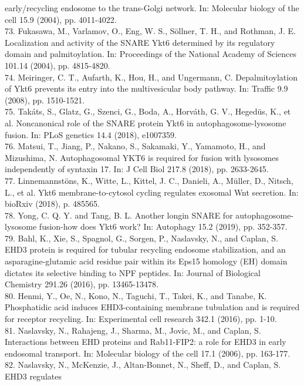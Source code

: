 \documentclass[12pt,english]{article}
\begin{document}
early/recycling endosome to the trans-Golgi network. In: Molecular biology of the cell
15.9 (2004), pp. 4011-4022.
\\
73. Fukasawa, M., Varlamov, O., Eng, W. S., Söllner, T. H., and Rothman, J. E. Localization
and activity of the SNARE Ykt6 determined by its regulatory domain and
palmitoylation. In: Proceedings of the National Academy of Sciences 101.14 (2004),
pp. 4815-4820.
\\
74. Meiringer, C. T., Aufarth, K., Hou, H., and Ungermann, C. Depalmitoylation of
Ykt6 prevents its entry into the multivesicular body pathway. In: Traffic 9.9 (2008),
pp. 1510-1521.
\\
75. Takáts, S., Glatz, G., Szenci, G., Boda, A., Horváth, G. V., Heged{\"u}s, K., et al. Noncanonical
role of the SNARE protein Ykt6 in autophagosome-lysosome fusion. In:
PLoS genetics 14.4 (2018), e1007359.
\\
76. Matsui, T., Jiang, P., Nakano, S., Sakamaki, Y., Yamamoto, H., and Mizushima, N.
Autophagosomal YKT6 is required for fusion with lysosomes independently of syntaxin
17. In: J Cell Biol 217.8 (2018), pp. 2633-2645.
\\
77. Linnemannstöns, K., Witte, L., Kittel, J. C., Danieli, A., Müller, D., Nitsch, L., et
al. Ykt6 membrane-to-cytosol cycling regulates exosomal Wnt secretion. In: bioRxiv
(2018), p. 485565.
\\
78. Yong, C. Q. Y. and Tang, B. L. Another longin SNARE for autophagosome-lysosome
fusion-how does Ykt6 work? In: Autophagy 15.2 (2019), pp. 352-357.
\\
79. Bahl, K., Xie, S., Spagnol, G., Sorgen, P., Naslavsky, N., and Caplan, S. EHD3 protein
is required for tubular recycling endosome stabilization, and an asparagine-glutamic
acid residue pair within its Eps15 homology (EH) domain dictates its selective binding
to NPF peptides. In: Journal of Biological Chemistry 291.26 (2016), pp. 13465-13478.
\\
80. Henmi, Y., Oe, N., Kono, N., Taguchi, T., Takei, K., and Tanabe, K. Phosphatidic acid
induces EHD3-containing membrane tubulation and is required for receptor recycling.
In: Experimental cell research 342.1 (2016), pp. 1-10.
\\
81. Naslavsky, N., Rahajeng, J., Sharma, M., Jovic, M., and Caplan, S. Interactions between
EHD proteins and Rab11-FIP2: a role for EHD3 in early endosomal transport.
In: Molecular biology of the cell 17.1 (2006), pp. 163-177.
\\
82. Naslavsky, N., McKenzie, J., Altan-Bonnet, N., Sheff, D., and Caplan, S. EHD3 regulates
\end{document}
